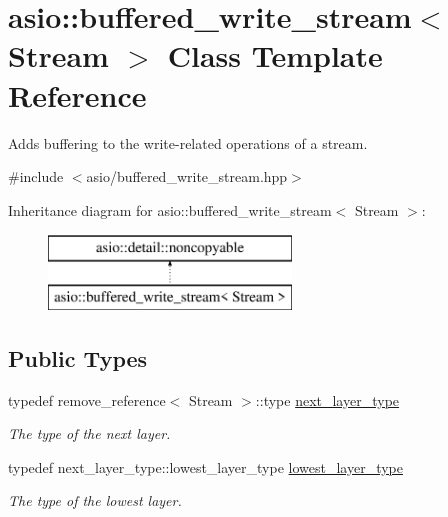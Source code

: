\hypertarget{classasio_1_1buffered__write__stream}{}\section{asio\+:\+:buffered\+\_\+write\+\_\+stream$<$ Stream $>$ Class Template Reference}
\label{classasio_1_1buffered__write__stream}


Adds buffering to the write-\/related operations of a stream.  




{\ttfamily \#include $<$asio/buffered\+\_\+write\+\_\+stream.\+hpp$>$}

Inheritance diagram for asio\+:\+:buffered\+\_\+write\+\_\+stream$<$ Stream $>$\+:\begin{figure}[H]
\begin{center}
\leavevmode
\includegraphics[height=2.000000cm]{classasio_1_1buffered__write__stream}
\end{center}
\end{figure}
\subsection*{Public Types}
\begin{DoxyCompactItemize}
\item 
typedef remove\+\_\+reference$<$ Stream $>$\+::type \hyperlink{classasio_1_1buffered__write__stream_a3de64e2c195304dba83b8ae5741be3f9}{next\+\_\+layer\+\_\+type}
\begin{DoxyCompactList}\small\item\em The type of the next layer. \end{DoxyCompactList}\item 
typedef next\+\_\+layer\+\_\+type\+::lowest\+\_\+layer\+\_\+type \hyperlink{classasio_1_1buffered__write__stream_af545c11f1e192498c8fa28743590191e}{lowest\+\_\+layer\+\_\+type}
\begin{DoxyCompactList}\small\item\em The type of the lowest layer. \end{DoxyCompactList}\end{DoxyCompactItemize}
